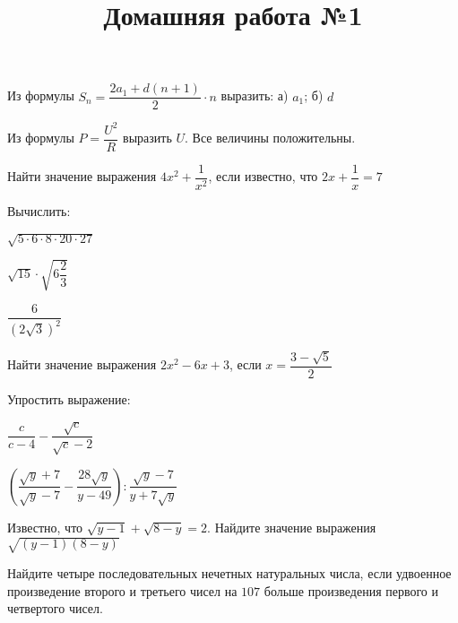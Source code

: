 \begin{listofex}
	\item {}
	\item Из формулы \( S_n=\dfrac{2a_1+d(n+1)}{2}\cdot n \) выразить: а) \( a_1 \); б) \( d \)
	\item Из формулы \( P=\dfrac{U^2}{R} \) выразить \( U \). Все величины положительны.
	\item Найти значение выражения \( 4x^2+\dfrac{1}{x^2} \), если известно, что \( 2x+\dfrac{1}{x}=7 \)
	\item {}
	\item {}
	\item Вычислить:
	\begin{enumcols}[itemcolumns=3]
		\item \( \sqrt{5\cdot6\cdot8\cdot20\cdot27} \)
		\item \( \sqrt{15}\cdot\sqrt{6\dfrac{2}{3}} \)
		\item \( \dfrac{6}{(2\sqrt{3})^2} \)
	\end{enumcols}
	\item Найти значение выражения \( 2x^2-6x+3 \), если \( x=\dfrac{3-\sqrt{5}}{2} \)
	\item Упростить выражение:
	\begin{enumcols}[itemcolumns=2]
		\item \( \dfrac{c}{c-4}-\dfrac{\sqrt{c}}{\sqrt{c}-2} \)
		\item \( \left( \dfrac{\sqrt{y}+7}{\sqrt{y}-7}-\dfrac{28\sqrt{y}}{y-49} \right):\dfrac{\sqrt{y}-7}{y+7\sqrt{y}} \)
	\end{enumcols}
	\item Известно, что \( \sqrt{y-1}+\sqrt{8-y}=2 \). Найдите значение выражения \( \sqrt{(y-1)(8-y)} \)
	\item Найдите четыре последовательных нечетных натуральных числа, если удвоенное
	произведение второго и третьего чисел на \( 107 \) больше произведения первого и четвертого
	чисел.
\end{listofex}
\newpage
\title{Домашняя работа №1}
